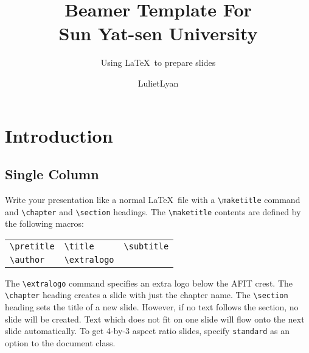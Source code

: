\documentclass{sysubeamer}
\title{Beamer Template For \\ Sun Yat-sen University}
\subtitle{Using \LaTeX\ to prepare slides}
\author{LulietLyan}
\begin{document}
\maketitle

\chapter{Introduction}

\section{Single Column}

Write your presentation like a normal \LaTeX\ file with a \verb|\maketitle|
command and \verb|\chapter| and \verb|\section| headings. The \verb|\maketitle|
contents are defined by the following macros:
\begin{center}
    \begin{tabular}{l@{\qquad}l@{\qquad}l}
        \verb|\pretitle| &
        \verb|\title| &
        \verb|\subtitle| \\
        \verb|\author| &
        \verb|\extralogo|
    \end{tabular}
\end{center}
The \verb|\extralogo| command specifies an extra logo below the AFIT crest. The
\verb|\chapter| heading creates a slide with just the chapter name. The
\verb|\section| heading sets the title of a new slide. However, if no text
follows the section, no slide will be created. Text which does not fit on one
slide will flow onto the next slide automatically. To get 4-by-3 aspect ratio
slides, specify \verb|standard| as an option to the document class.
\end{document}
